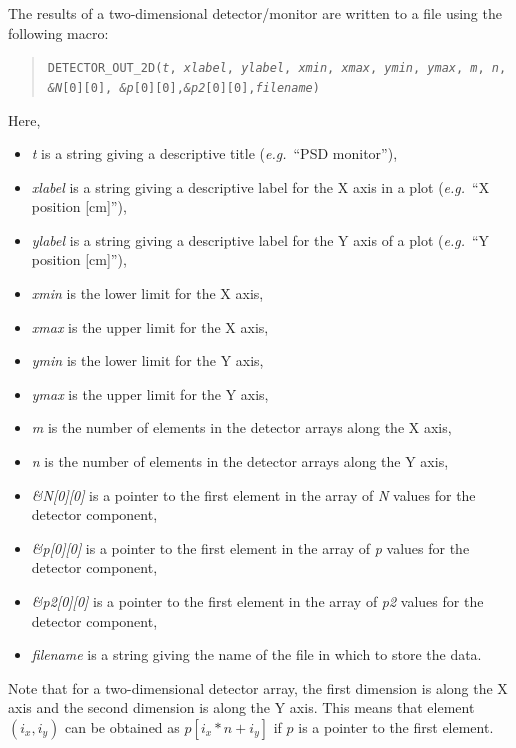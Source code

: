 The results of a two-dimensional detector/\discretionary{}{}{}mon\-i\-tor are written to a file using the
following macro:
\begin{quote}
  \texttt{DETECTOR\_OUT\_2D(\textit{t}, \textit{xlabel}, \textit{ylabel},
    \textit{xmin}, \textit{xmax}, \textit{ymin}, \textit{ymax}, \textit{m}, \textit{n},\\
    \textit{\&N}[0][0], \textit{\&p}[0][0],\textit{\&p2}[0][0],\textit{filename})}
\end{quote}
Here,
\begin{itemize}
\item \textit{t} is a string giving a descriptive title ({\em e.g.}\ ``PSD
  monitor''),
\item \textit{xlabel} is a string giving a descriptive label for the X
  axis in a plot ({\em e.g.}\ ``X position [cm]''),
\item \textit{ylabel} is a string giving a descriptive label for the Y
  axis of a plot ({\em e.g.}\ ``Y position [cm]''),
\item \textit{xmin} is the lower limit for the X axis,
\item \textit{xmax} is the upper limit for the X axis,
\item \textit{ymin} is the lower limit for the Y axis,
\item \textit{ymax} is the upper limit for the Y axis,
\item \textit{m} is the number of elements in the detector arrays along the X axis,
\item \textit{n} is the number of elements in the detector arrays along the Y axis,
\item \textit{\&N[0][0]} is a pointer to the first element in the array of \textit{N}
  values for the detector component,
\item \textit{\&p[0][0]} is a pointer to the first element in the array of \textit{p}
  values for the detector component,
\item \textit{\&p2[0][0]} is a pointer to the first element in the array of
  \textit{p2} values for the detector component,
\item \textit{filename} is a string giving the name of the file in which
  to store the data.
\end{itemize}
Note that for a two-dimensional detector array, the first dimension is
along the X axis and the second dimension is along the Y axis. This
means that element $(i_x,i_y)$ can be obtained as $p[i_x*n+i_y]$ if $p$
is a pointer to the first element.

